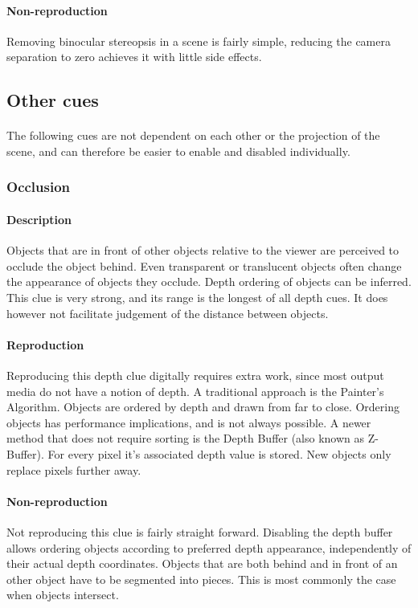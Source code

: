 \paragraph{Non-reproduction}
Removing binocular stereopsis in a scene is fairly simple, reducing the camera separation to zero achieves it with little side effects.


\subsection{Other cues}
\paragraph{}
The following cues are not dependent on each other or the projection of the scene, and can therefore be easier to enable and disabled individually.

\subsubsection{Occlusion}
\paragraph{Description}
Objects that are in front of other objects relative to the viewer are perceived to occlude the object behind.
Even transparent or translucent objects often change the appearance of objects they occlude.
Depth ordering of objects can be inferred.
This clue is very strong, and its range is the longest of all depth cues.
It does however not facilitate judgement of the distance between objects.

\paragraph{Reproduction}
Reproducing this depth clue digitally requires extra work, since most output media do not have a notion of depth. A traditional approach is the Painter's Algorithm\cite{painters}. Objects are ordered by depth and drawn from far to close. Ordering objects has performance implications, and is not always possible.
A newer method that does not require sorting is the Depth Buffer\cite{zbuffer} (also known as Z-Buffer). For every pixel it's associated depth value is stored. New objects only replace pixels further away.

\paragraph{Non-reproduction}
Not reproducing this clue is fairly straight forward. Disabling the depth buffer allows ordering objects according to preferred depth appearance, independently of their actual depth coordinates. Objects that are both behind and in front of an other object have to be segmented into pieces. This is most commonly the case when objects intersect.

